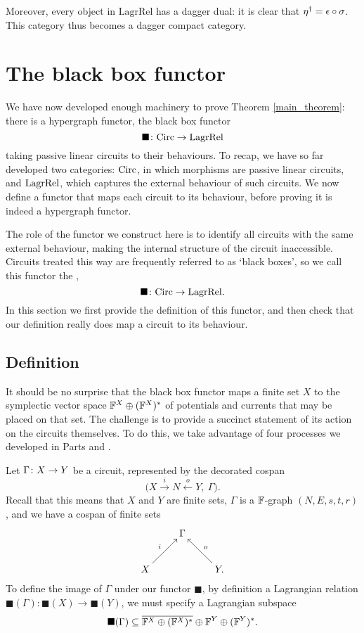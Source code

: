 Moreover, every object in $\mathrm{LagrRel}$ has a dagger dual: it is clear that
$\eta^\dagger = \epsilon \circ \sigma$.   This category thus becomes a dagger compact
category.


\section{The black box functor} \label{sec:blackbox}
We have now developed enough machinery to prove Theorem \ref{main_theorem}:
there is a hypergraph functor, the black box functor
\[  
\blacksquare{\colon} \mathrm{Circ} \to \mathrm{LagrRel} 
\]
taking passive linear circuits to their behaviours. To recap, we have so far
developed two categories: $\mathrm{Circ}$, in which morphisms are passive linear
circuits, and $\mathrm{LagrRel}$, which captures the external behaviour of such circuits.
We now define a functor that maps each circuit to its behaviour, before proving
it is indeed a hypergraph functor. 

The role of the functor we construct here is to identify all circuits with the
same external behaviour, making the internal structure of the circuit
inaccessible. Circuits treated this way are frequently referred to as
`black boxes', so we call this functor the ,
\[
\blacksquare{\colon} \mathrm{Circ} \to \mathrm{LagrRel}.
\] 
In this section we first provide the definition of this functor, and then check
that our definition really does map a circuit to its behaviour.

\subsection{Definition}
It should be no surprise that the black box functor maps a finite set $X$ to the
symplectic vector space ${\mathbb F}^X \oplus ({\mathbb F}^X)^\ast$ of potentials and currents
that may be placed on that set. The challenge is to provide a succinct
statement of its action on the circuits themselves. To do this, we take
advantage of four processes we developed in Parts  and
.

Let $\Gamma{\colon} X \to Y$ be a circuit, represented by the decorated cospan
\[
  \big(X \stackrel{i}{\longrightarrow} N \stackrel{o}{\longleftarrow} Y,\:
  \Gamma\big).
\]
Recall that this means that $X$ and $Y$ are finite sets, $\Gamma$ is a
${\mathbb F}$-graph $(N,E,s,t,r)$, and we have a cospan of finite sets
\[
  \xymatrix{
    & \Gamma \\
    X \ar[ur]^{i} && Y. \ar[ul]_{o}
  }
\]
To define the image of $\Gamma$ under our functor $\blacksquare$, by definition
a Lagrangian relation $\blacksquare(\Gamma): \blacksquare(X) \to
\blacksquare(Y)$, we must specify a Lagrangian subspace 
\[
  \blacksquare(\Gamma) \subseteq \overline{{\mathbb F}^X \oplus ({\mathbb F}^X)^\ast} \oplus {\mathbb F}^Y
  \oplus ({\mathbb F}^Y)^\ast.  
\]

